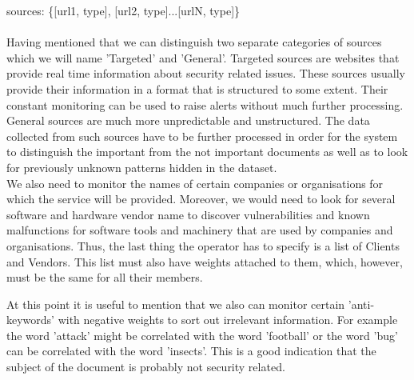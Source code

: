 \documentclass[12pt]{article}
\begin{document}
sources: \{[url1, type], [url2, type]...[urlN, type]\}\\\\
Having mentioned that we can distinguish two separate categories of sources which we will name 'Targeted' and 'General'. Targeted sources are websites that provide real time information about security related issues. These sources usually provide their information in a format that is structured to some extent. Their constant monitoring can be used to raise alerts without much further processing.
\hfill \break \\
General sources are much more unpredictable and unstructured. The data collected from such sources have to be further processed in order for the system to distinguish the important from the not important documents as well as to look for previously unknown patterns hidden in the dataset. 
\hfill \break \\
We also need to monitor the names of certain companies or organisations for which the service will be provided. Moreover, we would need to look for several software and hardware vendor name to discover vulnerabilities and known malfunctions for software tools and machinery that are used by companies and organisations. Thus, the last thing the operator has to specify is a list of Clients and Vendors. This list must also have weights attached to them, which, however, must be the same for all their members. 
\hfill \break \\
\parbox{\linewidth}{
At this point it is useful to mention that we also can monitor certain 'anti-keywords' with negative weights to sort out irrelevant information. For example the word 'attack' might be correlated with the word 'football' or the word 'bug' can be correlated with the word 'insects'. This is a good indication that the subject of the document is probably not security related. 
}
\end{document}
